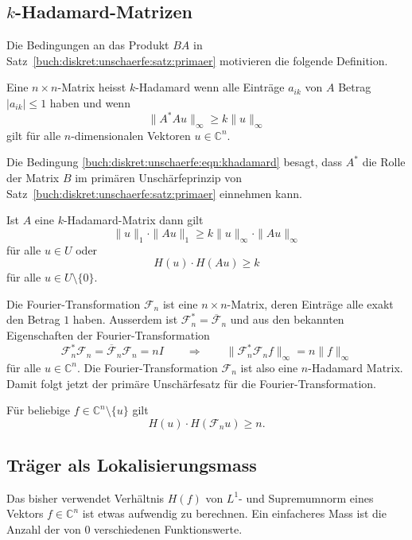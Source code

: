 %
%
\subsection{$k$-Hadamard-Matrizen}
Die Bedingungen an das Produkt $BA$ in
Satz~\ref{buch:diskret:unschaerfe:satz:primaer}
motivieren die folgende Definition.

\begin{definition}
\label{buch:diskret:unschaerfe:def:khadamard}
Eine $n\times n$-Matrix heisst $k$-Hadamard wenn alle Einträge $a_{ik}$ von
$A$ Betrag $|a_{ik}|\le 1$ haben und wenn
\begin{equation}
\|A^*Au\|_\infty \ge k\|u\|_\infty
\label{buch:diskret:unschaerfe:eqn:khadamard}
\end{equation}
gilt für alle $n$-dimensionalen Vektoren $u\in \mathbb{C}^n$.
\end{definition}

Die Bedingung 
\eqref{buch:diskret:unschaerfe:eqn:khadamard}
besagt, dass $A^*$ die Rolle der Matrix $B$ im primären
Unschärfeprinzip von Satz~\ref{buch:diskret:unschaerfe:satz:primaer}
einnehmen kann.

\begin{satz}
Ist $A$ eine $k$-Hadamard-Matrix dann gilt
\[
\|u\|_1\cdot \|Au\|_1 \ge k\|u\|_\infty \cdot \|Au\|_\infty
\]
für alle $u\in U$ oder
\[
H(u)\cdot H(Au)\ge k
\]
für alle $u \in U\setminus\{0\}$.
\end{satz}

Die Fourier-Transformation $\mathscr{F}_n$ ist eine $n\times n$-Matrix,
deren Einträge alle exakt den Betrag $1$ haben.
Ausserdem ist $\mathscr{F}_n^* = \overline{\mathscr{F}}_n$ und aus den 
bekannten Eigenschaften der Fourier-Transformation
\[
\mathscr{F}_n^*\mathscr{F}_n
=
\overline{\mathscr{F}}_n\mathscr{F}_n
=
nI
\qquad\Rightarrow\qquad
\| \mathscr{F}_n^*\mathscr{F}_n f\|_\infty
=
n \|f\|_\infty
\]
für alle $u\in\mathbb{C}^n$.
Die Fourier-Transformation $\mathscr{F}_n$ ist also eine
$n$-Hadamard Matrix.
Damit folgt jetzt der primäre Unschärfesatz für die Fourier-Transformation.

\begin{satz}
Für beliebige $f\in \mathbb{C}^n\setminus\{u\}$ gilt
\begin{equation}
H(u)\cdot H(\mathscr{F}_nu) \ge n.
\end{equation}
\end{satz}

%
%
\subsection{Träger als Lokalisierungsmass}
Das bisher verwendet Verhältnis $H(f)$ von $L^1$- und Supremumnorm
eines Vektors $f\in\mathbb{C}^n$ ist etwas aufwendig zu berechnen.
Ein einfacheres Mass ist die Anzahl der von $0$ verschiedenen
Funktionswerte.

